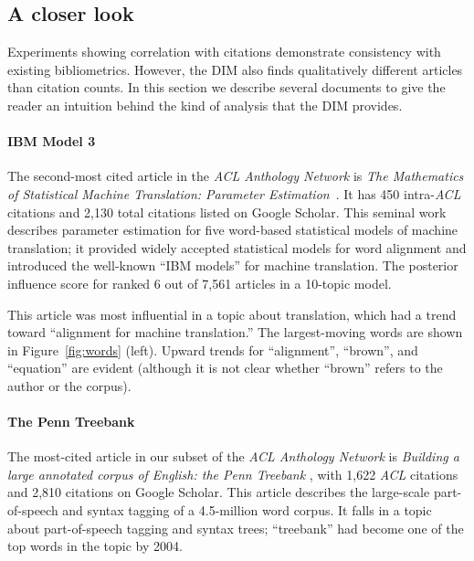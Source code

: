 \subsection*{A closer look}
Experiments showing correlation with citations demonstrate consistency
with existing bibliometrics. However, the DIM also finds qualitatively
different articles than citation counts. In this section we describe
several documents to give the reader an intuition behind the kind of
analysis that the DIM provides.

\paragraph{IBM Model 3} The second-most cited article in the \emph{ACL
  Anthology Network} is \emph{The Mathematics of Statistical Machine
  Translation: Parameter Estimation}~\cite{brown:1993}. It has 450
intra-\emph{ACL} citations and 2,130 total citations listed on Google
Scholar.  This seminal work describes parameter estimation for five
word-based statistical models of machine translation; it provided
widely accepted statistical models for word alignment and introduced
the well-known ``IBM models'' for machine translation. The posterior
influence score for \cite{brown:1993} ranked $6$ out of 7,561   %
articles in a 10-topic model.

This article was most influential in a topic about translation, which
had a trend toward ``alignment for machine translation.''  The
largest-moving words are shown in Figure~\ref{fig:words} (left).
Upward trends for ``alignment'', ``brown'', and ``equation'' are
evident (although it is not clear whether ``brown'' refers to the
author or the corpus).

\paragraph{The Penn Treebank}
The most-cited article in our subset of the \emph{ACL Anthology
  Network} is \emph{Building a large annotated corpus of English: the
  Penn Treebank} \cite{marcus:1993}, with 1,622 \emph{ACL} citations
and 2,810 citations on Google Scholar.  This article describes the
large-scale part-of-speech and syntax tagging of a 4.5-million word
corpus.  It falls in a topic about part-of-speech tagging and syntax
trees; ``treebank'' had become one of the top words in the topic by
2004.

